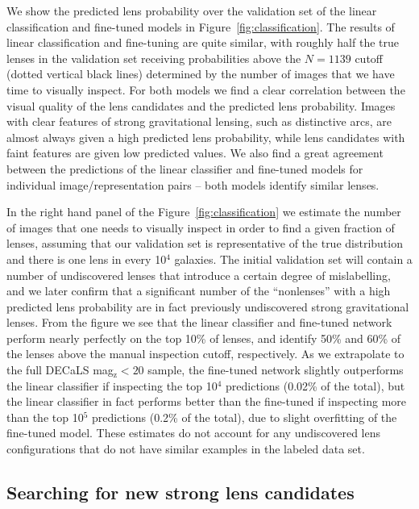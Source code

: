 \documentclass{aastex631}
\newcommand{\zmag}{mag$_{\mathrm{z}}$}
\begin{document}
We show the predicted lens probability over the validation set of the linear classification and fine-tuned models in Figure~\ref{fig:classification}. The results of linear classification and fine-tuning are quite similar, with roughly half the true lenses in the validation set receiving probabilities above the $N=1139$ cutoff (dotted vertical black lines) determined by the number of images that we have time to visually inspect. For both models we find a clear correlation between the visual quality of the lens candidates and the predicted lens probability. Images with clear features of strong gravitational lensing, such as distinctive arcs, are almost always given a high predicted lens probability, while lens candidates with faint features are given low predicted values. We also find a great agreement between the predictions of the linear classifier and fine-tuned models for individual image/representation pairs -- both models identify similar lenses. 

In the right hand panel of the Figure~\ref{fig:classification} we estimate the number of images that one needs to visually inspect in order to find a given fraction of lenses, assuming that our validation set is representative of the true distribution and there is one lens in every 10$^4$ galaxies. The initial validation set will contain a number of undiscovered lenses that introduce a certain degree of mislabelling, and we later confirm that a significant number of the ``nonlenses'' with a high predicted lens probability are in fact previously undiscovered strong gravitational lenses. From the figure we see that the linear classifier and fine-tuned network perform nearly perfectly on the top 10\% of lenses, and identify 50\% and 60\% of the lenses above the manual inspection cutoff, respectively. As we extrapolate to the full DECaLS \zmag $< 20$ sample, the fine-tuned network slightly outperforms the linear classifier if inspecting the top 10$^4$ predictions (0.02\% of the total), but the linear classifier in fact performs better than the fine-tuned if inspecting more than the top 10$^5$ predictions (0.2\% of the total), due to slight overfitting of the fine-tuned model. These estimates do not account for any undiscovered lens configurations that do not have similar examples in the labeled data set.

\subsection{Searching for new strong lens candidates}
\end{document}
